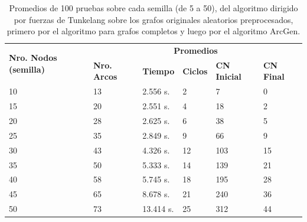 

\begin{table}[H]
	\caption{Promedios de 100 pruebas sobre cada semilla (de 5 a 50), del algoritmo dirigido por fuerzas de Tunkelang sobre los grafos originales aleatorios preprocesados, primero por el algoritmo para grafos completos y luego por el algoritmo ArcGen.}
	\label{tab:resultados_orig_alg_com_gen_fue}
	\begin{tabularx}{\linewidth}{|p{1.5cm}|p{1.2cm}|p{1.5cm}|p{1.5cm}|X|X|}
		\hline
		\multirow{2}{2cm}{\textbf{Nro. Nodos (semilla)}} & \multicolumn{5}{c|}{\textbf{Promedios}} \\
		\cline{2-6} & \textbf{Nro. Arcos} & \textbf{Tiempo} & \textbf{Ciclos} & \textbf{CN Inicial} & \textbf{CN Final} \\
		\hline
		10 & 13 & 2.556 s. & 2 & 7 & 0 \\
		\hline
		15 & 20 & 2.551 s. & 4 & 18 & 2 \\
		\hline
		20 & 28 & 2.625 s. & 6 & 38 & 5 \\
		\hline
		25 & 35 & 2.849 s. & 9 & 66 & 9 \\
		\hline
		30 & 43 & 4.326 s. & 12 & 103 & 15 \\
		\hline
		35 & 50 & 5.333 s. & 14 & 139 & 21 \\
		\hline
		40 & 58 & 5.745 s. & 18 & 195 & 28 \\
		\hline
		45 & 65 & 8.678 s. & 21 & 240 & 36 \\
		\hline
		50 & 73 & 13.414 s. & 25 & 312 & 44 \\
		\hline
	\end{tabularx}
\end{table}


